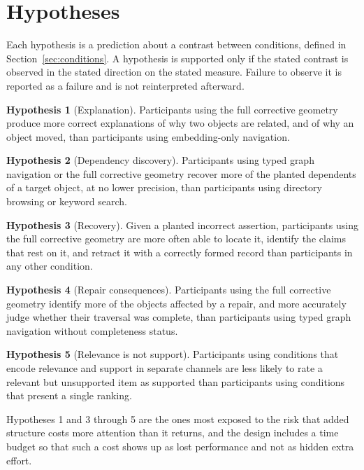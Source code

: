 \documentclass[11pt]{article}
\theoremstyle{definition}
\newtheorem{hypothesis}{Hypothesis}
\begin{document}
\section{Hypotheses}

Each hypothesis is a prediction about a contrast between conditions, defined in Section~\ref{sec:conditions}. A hypothesis is supported only if the stated contrast is observed in the stated direction on the stated measure. Failure to observe it is reported as a failure and is not reinterpreted afterward.

\begin{hypothesis}[Explanation]
Participants using the full corrective geometry produce more correct explanations of why two objects are related, and of why an object moved, than participants using embedding-only navigation.
\end{hypothesis}

\begin{hypothesis}[Dependency discovery]
Participants using typed graph navigation or the full corrective geometry recover more of the planted dependents of a target object, at no lower precision, than participants using directory browsing or keyword search.
\end{hypothesis}

\begin{hypothesis}[Recovery]
Given a planted incorrect assertion, participants using the full corrective geometry are more often able to locate it, identify the claims that rest on it, and retract it with a correctly formed record than participants in any other condition.
\end{hypothesis}

\begin{hypothesis}[Repair consequences]
Participants using the full corrective geometry identify more of the objects affected by a repair, and more accurately judge whether their traversal was complete, than participants using typed graph navigation without completeness status.
\end{hypothesis}

\begin{hypothesis}[Relevance is not support]
Participants using conditions that encode relevance and support in separate channels are less likely to rate a relevant but unsupported item as supported than participants using conditions that present a single ranking.
\end{hypothesis}

Hypotheses 1 and 3 through 5 are the ones most exposed to the risk that added structure costs more attention than it returns, and the design includes a time budget so that such a cost shows up as lost performance and not as hidden extra effort.
\end{document}
